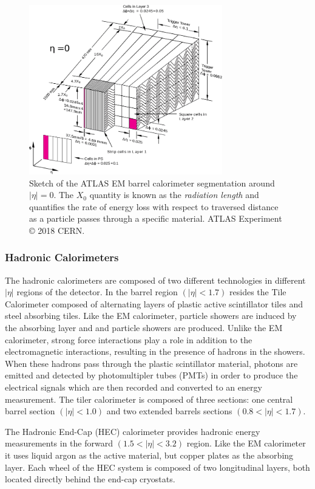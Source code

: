 \begin{figure}
	\centering
	\includegraphics[width=0.75\textwidth]{em_calo_segment}
	\caption{Sketch of the ATLAS EM barrel calorimeter segmentation around $|\eta| = 0$. 
	The $X_0$ quantity is known as the \textit{radiation length} and quantifies the rate of energy loss with respect to traversed distance as a particle passes through a specific material.
	ATLAS Experiment © 2018 CERN.}
	\label{fig:em_calo_segment}
\end{figure}

\subsubsection{Hadronic Calorimeters}
The hadronic calorimeters are composed of two different technologies in different $|\eta|$ regions of the detector.
In the barrel region $(|\eta| < 1.7)$ resides the Tile Calorimeter composed of alternating layers of plastic active scintillator tiles and steel absorbing tiles.
Like the EM calorimeter, particle showers are induced by the absorbing layer and and particle showers are produced.
Unlike the EM calorimeter, strong force interactions play a role in addition to the electromagnetic interactions, resulting in the presence of hadrons in the showers.
When these hadrons pass through the plastic scintillator material, photons are emitted and detected by photomultipler tubes (PMTs) in order to produce the electrical signals which are then recorded and converted to an energy measurement.
The tiler calorimeter is composed of three sections: one central barrel section $(|\eta| < 1.0)$ and two extended barrels sections $(0.8 < |\eta| < 1.7)$.

The Hadronic End-Cap (HEC) calorimeter provides hadronic energy measurements in the forward $(1.5 < |\eta| < 3.2)$ region.
Like the EM calorimeter it uses liquid argon as the active material, but copper plates as the absorbing layer.
Each wheel of the HEC system is composed of two longitudinal layers, both located directly behind the end-cap cryostats.

